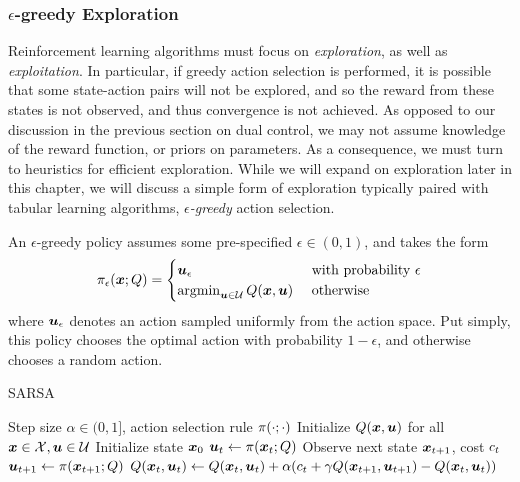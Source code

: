 \subsubsection{$\epsilon$-greedy Exploration}

Reinforcement learning algorithms must focus on \textit{exploration}, as well as \textit{exploitation}. In particular, if greedy action selection is performed, it is possible that some state-action pairs will not be explored, and so the reward from these states is not observed, and thus convergence is not achieved. As opposed to our discussion in the previous section on dual control, we may not assume knowledge of the reward function, or priors on parameters. As a consequence, we must turn to heuristics for efficient exploration. While we will expand on exploration later in this chapter, we will discuss a simple form of exploration typically paired with tabular learning algorithms, \textit{$\epsilon$-greedy} action selection. 

An $\epsilon$-greedy policy assumes some pre-specified $\epsilon \in (0,1)$, and takes the form
\begin{align}
    \pi_{\epsilon}(\bm{x}; Q) = \begin{cases}
    \bm{u}_\epsilon \,\, &\text{with probability}\,\, \epsilon\\
    \text{argmin}_{\bm{u} \in \mathcal{U}} \, Q(\bm{x},\bm{u})\,\, &\text{otherwise}
    \end{cases}
\end{align}
where $\bm{u}_{\epsilon}$ denotes an action sampled uniformly from the action space. Put simply, this policy chooses the optimal action with probability $1-\epsilon$, and otherwise chooses a random action. 

\begin{algorithm}[t]
\caption{SARSA}
\centering
\label{alg:SARSA}

\begin{algorithmic}[1]
    \Require Step size $\alpha \in (0,1]$, action selection rule $\pi(\cdot; \cdot)$
    \State Initialize $Q(\bm{x},\bm{u})$ for all $\bm{x} \in \mathcal{X}, \bm{u} \in \mathcal{U}$
        \State Initialize state $\bm{x}_0$
        \State $\bm{u}_t \gets \pi(\bm{x}_t; Q)$
            \State Observe next state $\bm{x}_{t+1}$, cost $c_{t}$
            \State $\bm{u}_{t+1} \gets \pi(\bm{x}_{t+1}; Q)$
            \State $Q(\bm{x}_t,\bm{u}_t) \gets Q(\bm{x}_t,\bm{u}_t) + \alpha (c_t + \gamma Q(\bm{x}_{t+1},\bm{u}_{t+1}) - Q(\bm{x}_t,\bm{u}_t))$
        \EndFor
    \EndFor
\end{algorithmic}
\end{algorithm}


